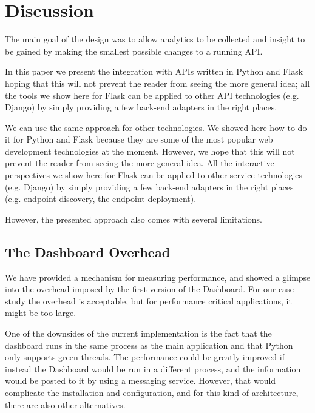 
\section{Discussion}



  The main goal of the \tool design was to allow analytics to be collected and insight to be gained by making the smallest possible changes to a running API. 

  In this paper we present the integration with APIs written in Python and Flask hoping that this will not prevent the reader from seeing the more general idea; all the tools we show here for Flask can be applied to other API technologies (e.g. Django) by simply providing a few back-end adapters in the right places.


  We can use the same approach for other technologies. We showed here how to do it for Python and Flask because they are some of the most popular web development technologies at the moment. However, we hope that this will not prevent the reader from seeing the more general idea. All the interactive perspectives we show here for Flask can be applied to other service technologies (e.g. Django) by simply providing a few back-end adapters in the right places (e.g. endpoint discovery, the  endpoint deployment). 

  However, the presented approach also comes with several limitations.

  \subsection*{The Dashboard Overhead}

    We have provided a mechanism for measuring performance, and showed a glimpse into the overhead imposed by the first version of the Dashboard. For our case study the overhead is acceptable, but for performance critical applications, it might be too large. 

    One of the downsides of the current implementation is the fact that the dashboard runs in the same process as the main application and that Python only supports green threads. The performance could be greatly improved if instead the Dashboard would be run in a different process, and the information would be posted to it by using a messaging service. However, that would complicate the installation and configuration, and for this kind of architecture, there are also other alternatives.

